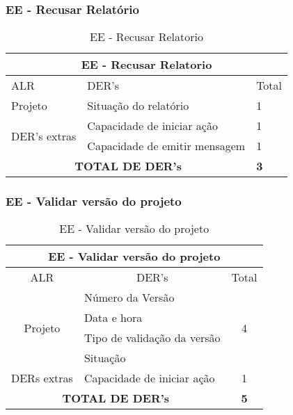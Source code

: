 \vfill
\pagebreak
  \subsubsection{EE - Recusar Relatório }
    \begin{table}[!h]
\centering
\caption{EE - Recusar Relatorio}
\label{ee_recusar_relatorio_parcial}
\begin{tabular}{|l|l|l|}
\hline
\multicolumn{3}{|c|}{EE - Recusar Relatorio}           \\ \hline
ALR                      & DER's                      & Total         \\ \hline
Projeto                  & Situação do relatório      & 1             \\\hline
  \multirow{2}{*}{DER's extras} & Capacidade de iniciar ação             & 1 \\ \cline{2-3}
                 & Capacidade de emitir mensagem& 1 \\ \hline
\multicolumn{2}{|c|}{\textbf{TOTAL DE DER's}}                & \textbf{3} \\ \hline
\end{tabular}
\end{table}

  \subsubsection{EE - Validar versão do projeto}
   
      \begin{table}[!h]
      \centering
      \caption{EE - Validar versão do projeto}
      \label{ee_validar_versao_projeto}
      \begin{tabular}{|c|l|c|}
      \hline
      \multicolumn{3}{|c|}{EE - Validar versão do projeto}                        \\ \hline
      ALR                      & \multicolumn{1}{c|}{DER's}  & Total              \\ \hline
      \multirow{4}{*}{Projeto} & Número da Versão            & \multirow{4}{*}{4} \\ \cline{2-2}
			      & Data e hora                 &                    \\ \cline{2-2}
			      & Tipo de validação da versão &                    \\ \cline{2-2}
			      & Situação                    &                    \\ \hline
      DERs extras              & Capacidade de iniciar ação  & 1                  \\ \hline
      \multicolumn{2}{|c|}{\textbf{TOTAL DE DER's}}          & \textbf{5}         \\ \hline
      \end{tabular}
      \end{table}
   
